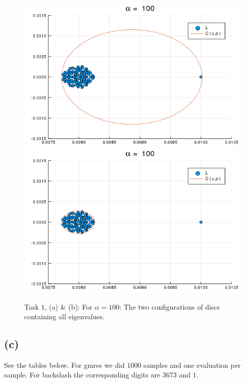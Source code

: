 \begin{figure}[h!]
\centering
\includegraphics[scale=0.4]{../task2/images/Task2_b_a100_1.png}
\includegraphics[scale=0.4]{../task2/images/Task2_b_a100_2.png}
\caption{Task $1$, (a) \& (b):  For $\alpha = 100$: The two configurations of discs containing all eigenvalues.}
\label{fig:task2b_100}
\end{figure}
\FloatBarrier
\subsection*{(c)}
See the tables below. For gmres we did $1000$ samples and one evaluation per sample. For backslash the corresponding digits are $3673$ and $1$.

